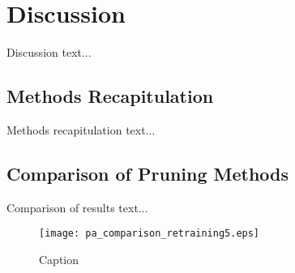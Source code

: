 \chapter{Discussion} \label{chap:discussion}
Discussion text...

\section{Methods Recapitulation} \label{sec:methods_recapitulation}
Methods recapitulation text...

\section{Comparison of Pruning Methods} \label{sec:comparison_of_pruning_methods}
Comparison of results text...

\begin{figure}[H]
\centering
\texttt{[image: pa\_comparison\_retraining5.eps]}
\caption{Caption}
\label{fig:discussion:pa_comparison_retraining5}
\end{figure}